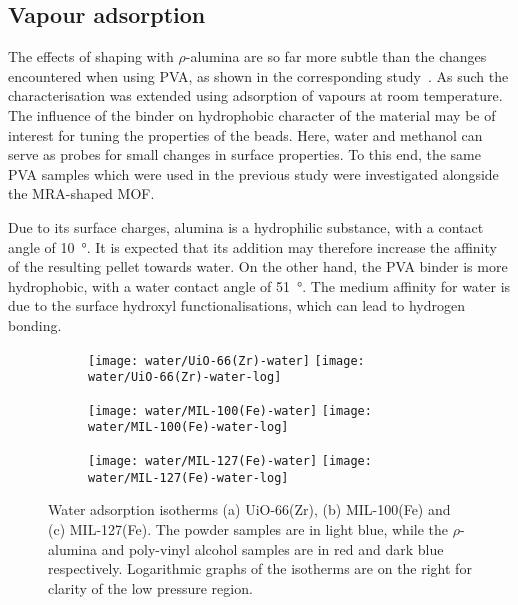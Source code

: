 
\subsection{Vapour adsorption}

The effects of shaping with \(\rho\)-alumina are 
so far more subtle than the changes encountered when using 
\gls{PVA}, as shown in the corresponding 
study~\cite{chanutObservingEffectsShaping2016}.
As such the characterisation was extended using adsorption
of vapours at room temperature.
The influence of the binder on hydrophobic character of the
material may be of interest for tuning the properties of the 
beads. Here, water and methanol
can serve as probes for small changes in surface properties.
To this end, the same \gls{PVA} samples which were 
used in the previous study were investigated alongside 
the \gls{MRA}-shaped \gls{MOF}.

Due to its surface charges, alumina is a 
hydrophilic substance, with a contact 
angle of \SI{10}{\degree}. It is expected that its 
addition may therefore increase the affinity 
of the resulting pellet towards water. On the other hand,
the \gls{PVA} binder is more hydrophobic, with a water contact
angle of \SI{51}{\degree}. The medium affinity for water
is due to the surface hydroxyl functionalisations, which
can lead to hydrogen bonding.

\begin{figure}[p!]
    \centering
    
    \begin{subfigure}{\linewidth}
        \centering
        \texttt{[image: water/UiO-66(Zr)-water]}%
        \texttt{[image: water/UiO-66(Zr)-water-log]}%
        \caption{}\label{shaping:fig:wateruio66}
    \end{subfigure}%

    \begin{subfigure}{\linewidth}
        \centering
        \texttt{[image: water/MIL-100(Fe)-water]}%
        \texttt{[image: water/MIL-100(Fe)-water-log]}%
        \caption{}\label{shaping:fig:watermil100}
    \end{subfigure}%

    \begin{subfigure}{\linewidth}
        \centering
        \texttt{[image: water/MIL-127(Fe)-water]}%
        \texttt{[image: water/MIL-127(Fe)-water-log]}%
        \caption{}\label{shaping:fig:watermil127}%
    \end{subfigure}%
    
    \caption{Water adsorption isotherms (a) UiO-66(Zr), 
    (b) MIL-100(Fe) and (c) MIL-127(Fe). The powder samples are in light
    blue, while the \(\rho\)-alumina and poly-vinyl alcohol samples are
    in red and dark blue respectively. Logarithmic graphs of the
    isotherms are on the right for clarity of the low
    pressure region.}%
    \label{shaping:fig:wateradsorption}
\end{figure}

